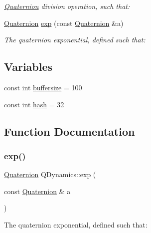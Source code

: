\begin{DoxyCompactItemize}
\begin{DoxyCompactList}\small\item\em \hyperlink{classQDynamics_1_1Quaternion}{Quaternion} division operation, such that\+: \end{DoxyCompactList}\item 
\hyperlink{classQDynamics_1_1Quaternion}{Quaternion} \hyperlink{namespaceQDynamics_aa458e456eca06783fd8c41b7ac2b1400}{exp} (const \hyperlink{classQDynamics_1_1Quaternion}{Quaternion} \&a)
\begin{DoxyCompactList}\small\item\em The quaternion exponential, defined such that\+: \end{DoxyCompactList}\end{DoxyCompactItemize}
\subsection*{Variables}
\begin{DoxyCompactItemize}
\item 
const int \hyperlink{namespaceQDynamics_a06e91eeb11c659d8845569a642500675}{buffersize} = 100
\item 
const int \hyperlink{namespaceQDynamics_ac3ad3b89bbd65796d1f4f5e4809a12ed}{hash} = 32
\end{DoxyCompactItemize}


\subsection{Function Documentation}
\mbox{\label{namespaceQDynamics_aa458e456eca06783fd8c41b7ac2b1400}} 
\subsubsection{\texorpdfstring{exp()}{exp()}}
{\footnotesize\ttfamily \hyperlink{classQDynamics_1_1Quaternion}{Quaternion} Q\+Dynamics\+::exp (\begin{DoxyParamCaption}\item[{const \hyperlink{classQDynamics_1_1Quaternion}{Quaternion} \&}]{a }\end{DoxyParamCaption})\hspace{0.3cm}{\ttfamily [inline]}}



The quaternion exponential, defined such that\+: 

